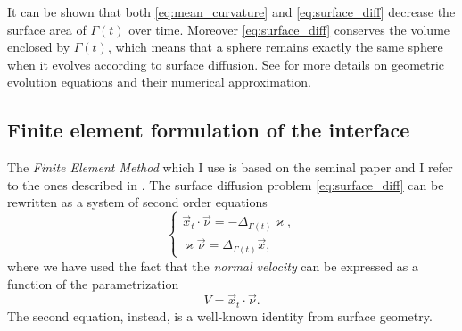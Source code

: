 \documentclass[a4paper,11pt, onecolumn]{article}
\newcommand{\cor}[1]{\textit{#1}} %
\begin{document}
It can be shown that both \eqref{eq:mean_curvature} and
\eqref{eq:surface_diff} decrease the surface area of $\Gamma(t)$ over time.
Moreover \eqref{eq:surface_diff} conserves the volume enclosed by $\Gamma(t)$,
which means that a sphere remains exactly the same sphere when it evolves
according to surface diffusion. See \cite{DeckelnickDE05} for more details on
geometric evolution equations and their numerical approximation.

\subsection{Finite element formulation of the interface}

The \cor{Finite Element Method} which I use is based on the seminal paper
\cite{Dziuk91} and I refer to the ones described in
\cite{triplej,triplejMC,gflows3d}. The surface diffusion problem
\eqref{eq:surface_diff} can be rewritten as a system of second order equations
\begin{equation}\label{eq:surf_diff_sys}
 \begin{cases}
  \vec{x}_t\cdot\vec{\nu}=-\Delta_{\Gamma(t)} \varkappa,\\
  \varkappa\vec{\nu}=\Delta_{\Gamma(t)}\vec{x},
 \end{cases}
\end{equation}
where we have used the fact that the \cor{normal velocity} can be expressed as a
function of the parametrization
\begin{equation}
 V=\vec{x}_t\cdot\vec{\nu}.
\end{equation}
The second equation, instead, is a well-known identity from surface geometry.
\newline
\end{document}
